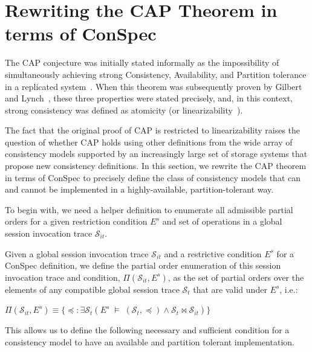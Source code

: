 \documentclass[journal,compsoc]{IEEEtran}
\begin{document}
\section{Rewriting the CAP Theorem in terms of ConSpec}\label{sec:cap}
The CAP conjecture was initially stated informally as the impossibility of simultaneously achieving strong Consistency, Availability, and Partition tolerance in a replicated system~\cite{brew:cap}. When this theorem was subsequently proven by Gilbert and Lynch~\cite{Gilbert:2002:BCF:564585.564601}, these three properties were stated precisely, and, in this context, strong consistency was defined as atomicity (or linearizability~\cite{Herlihy:1990:LCC:78969.78972}).

The fact that the original proof of CAP is restricted to linearizability raises the question of whether CAP holds using other definitions from
 the wide array of consistency models supported by an increasingly large set of storage systems that propose new consistency definitions.
 In this section, we rewrite the CAP theorem in terms of ConSpec to precisely define the class of consistency models that can and cannot be implemented in a highly-available, partition-tolerant way.




To begin with, we need a helper definition to enumerate all admissible partial orders for a given restriction condition $E^s$ and set of operations in a global session invocation trace $\mathcal{S}_{it}$.

\begin{definition} \label{def:allpos}
Given a global session invocation trace $\mathcal{S}_{it}$ and a restrictive condition $E^s$
for a ConSpec definition, we define the partial order enumeration
of this session invocation trace and condition, $\Pi(\mathcal{S}_{it},E^s)$, as
the set of partial orders over the elements of any compatible global session trace $\mathcal{S}_{t}$ that are valid
under $E^s$, i.e.:


$\Pi(\mathcal{S}_{it},E^s) \equiv  \{\preccurlyeq: \exists \mathcal{S}_{t} \left(  E^s\; \vDash \; \left( {\mathcal{S}_{t}}, \preccurlyeq \right) \wedge \mathcal{S}_{t}\bowtie \mathcal{S}_{it} \right) \}$
\end{definition}

This allows us to define the following necessary and sufficient condition
for a consistency model to have an available and partition tolerant
implementation.
\end{document}
